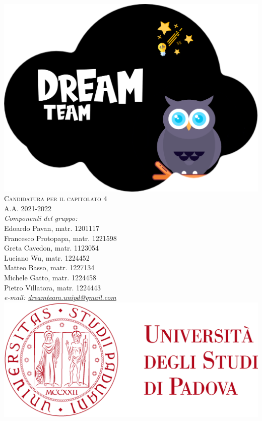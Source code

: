 \thispagestyle{empty}
\begin{titlepage}
	\begin{center}
		
		\includegraphics[scale = 0.05]{../latex/images/DreamTeam.png}\\[1.5cm]
\Huge \textsc{Candidatura per il capitolato 4 \doctitle{}}\\ [0.75cm]                          
\Large \textsf{A.A. 2021-2022} \\ [1cm]
		

\Large \textsl{Componenti del gruppo:} \\[.3cm] 
\Large \textsf{Edoardo Pavan, matr. 1201117} \\ [0.1cm]
\Large \textsf{Francesco Protopapa, matr. 1221598} \\ [0.1cm]
\Large \textsf{Greta Cavedon, matr. 1123054} \\ [0.1cm]
\Large \textsf{Luciano Wu, matr. 1224452} \\ [0.1cm]
\Large \textsf{Matteo Basso, matr. 1227134} \\ [0.1cm]
\Large \textsf{Michele Gatto, matr. 1224458} \\ [0.1cm]
\Large \textsf{Pietro Villatora, matr. 1224443} \\ [1cm]
  
\textsl{ e-mail: \href{mailto:dreamteam.unipd@gmail.com}{dreamteam.unipd@gmail.com} } \\[1cm]

		\includegraphics[scale = 0.055]{../latex/images/logoUniPD.png}


	\end{center}
\end{titlepage}
